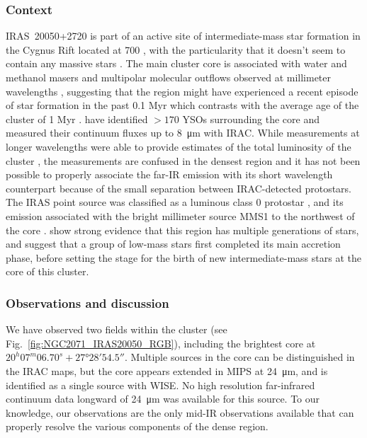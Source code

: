 \subsubsection{Context}
IRAS~20050+2720 is part of an active site of intermediate-mass star formation in the Cygnus Rift located at \SI{700}{\pc} \citep{Wilking:1989el}, with the particularity that it doesn't seem to contain any massive stars \citep{Gunther:2012dq}. The main cluster core is associated with water and methanol masers \citep{Palla:1991up,Fontani:2010cf} and multipolar molecular outflows observed at millimeter wavelengths \citep{Bachiller:1995cy,Anglada:1998uu,Beltran:2008gu}, suggesting that the region might have experienced a recent episode of star formation in the past 0.1 Myr which contrasts with the average age of the cluster of 1 Myr \citep{Chen:1997tb,Gutermuth:2005hx}. \cite{Gutermuth:2009gca} have identified $>170$ YSOs surrounding the core and measured their continuum fluxes up to \SI{8}{\micro\meter} with IRAC. While measurements at longer wavelengths were able to provide estimates of the total luminosity of the cluster \citep[e.g. using IRAS,][\SI{388}{\Lsun}]{Molinari:1996td}, the measurements are confused in the densest region and it has not been possible to properly associate the far-IR emission with its short wavelength counterpart because of the small separation between IRAC-detected protostars. The IRAS point source was classified as a luminous class 0 protostar \citep{Bachiller:1996ja}, and its emission associated with the bright millimeter source MMS1 to the northwest of the core \citep{Chini:2001fa}. \citet{Beltran:2008gu} show strong evidence that this region has multiple generations of stars, and suggest that a group of low-mass stars first completed its main accretion phase, before setting the stage for the birth of new intermediate-mass stars at the core of this cluster.


\subsubsection{Observations and discussion}


We have observed two fields within the cluster (see Fig.~\ref{fig:NGC2071_IRAS20050_RGB}), including the brightest core at $20^h 07^m 06.70^s +\ang{27;28;54.5}$. Multiple sources in the core can be distinguished in the IRAC maps, but the core appears extended in \Spitzer MIPS at \SI{24}{\micro\meter}, and is identified as a single source with WISE. No high resolution far-infrared continuum data longward of \SI{24}{\micro\meter} was available for this source. To our knowledge, our observations are the only mid-IR observations available that can properly resolve the various components of the dense region. 

